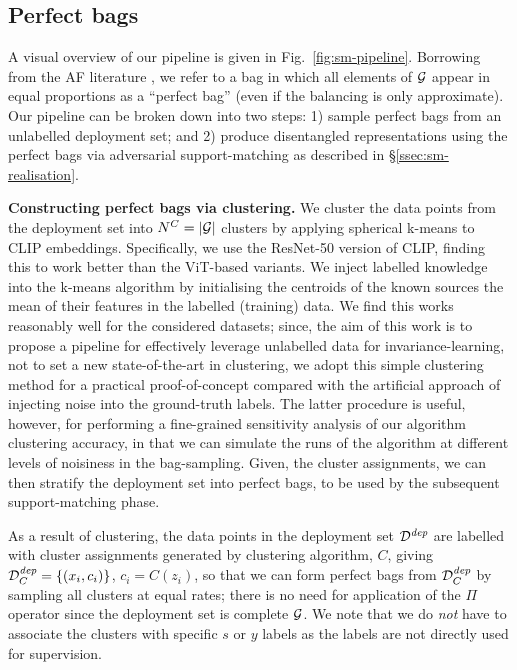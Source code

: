 %
\subsection{Perfect bags}\label{sec:sm-implementation}
%
A visual overview of our pipeline is given in Fig.~\ref{fig:sm-pipeline}. 
%
Borrowing from the \ac{AF} literature \citep{chouldechova17,KleMulRag16}, we refer to a bag in
which all elements of ${\mathcal{G}}$ appear in equal proportions as a ``perfect bag'' (even if the balancing
is only approximate). 
%
Our pipeline can be broken down into two steps: 1) sample perfect bags from an unlabelled
deployment set; and 2) produce disentangled representations using the perfect bags via adversarial
support-matching as described in \S\ref{ssec:sm-realisation}.

\textbf{Constructing perfect bags via clustering.}
%
We cluster the data points from the deployment set into \( N^C=|{\mathcal{G}}| \) clusters by applying
spherical k-means to CLIP \citep{radford2021learning} embeddings. 
%
Specifically, we use the ResNet-50 version of CLIP, finding this to work better than the ViT-based
variants. 
%
We inject labelled knowledge into the k-means algorithm by initialising the centroids of the known
sources the mean of their features in the labelled (training) data. 
%
We find this works reasonably well for the considered datasets; since, the aim of this work is to
propose a pipeline for effectively leverage unlabelled data for invariance-learning, not to set a
new state-of-the-art in clustering, we adopt this simple clustering method for a practical
proof-of-concept compared with the artificial approach of injecting noise into the ground-truth
labels. 
%
The latter procedure is useful, however, for performing a fine-grained sensitivity analysis of our
algorithm \wrt{} clustering accuracy, in that we can simulate the runs of the algorithm at
different levels of noisiness in the bag-sampling. 
%
%
Given, the cluster assignments, we can then stratify the deployment set into perfect bags, to be
used by the subsequent support-matching phase.

As a result of clustering, the data points in the deployment set \( {\mathcal{D}}^\mathit{dep} \) are
labelled with cluster assignments generated by clustering algorithm, \( C \), giving \(
{\mathcal{D}}^\mathit{dep}_C=\{(x_i, c_i)\} \), \(c_i = C(z_i) \),
%
so that we can form perfect bags from \( {\mathcal{D}}^\mathit{dep}_C \) by sampling all clusters at equal
rates; there is no need for application of the $\Pi$ operator since the deployment set is complete
\wrt{} ${\mathcal{G}}$.
%
We note that we do \emph{not} have to associate the clusters with specific $s$ or $y$ labels as the
labels are not directly used for supervision.

